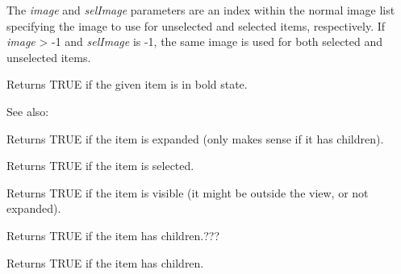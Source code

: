 The {\it image} and {\it selImage} parameters are an index within
the normal image list specifying the image to use for unselected and
selected items, respectively.
If {\it image} > -1 and {\it selImage} is -1, the same image is used for
both selected and unselected items.


\label{wxtreelistctrlisbold}


Returns TRUE if the given item is in bold state.

See also: 

\label{wxtreelistctrlisexpanded}


Returns TRUE if the item is expanded (only makes sense if it has children).

\label{wxtreelistctrlisselected}


Returns TRUE if the item is selected.

\label{wxtreelistctrlisvisible}


Returns TRUE if the item is visible (it might be outside the view, or not expanded).

\label{wxtreelistctrlhaschildren}


Returns TRUE if the item has children.???

\label{wxtreelistctrlitemhaschildren}


Returns TRUE if the item has children.

\label{wxtreelistctrloncompareitems}


